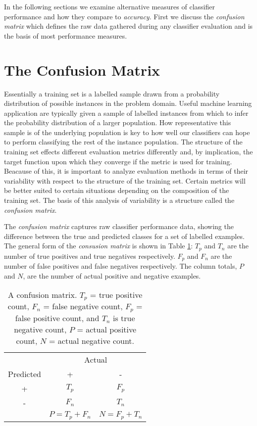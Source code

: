 \documentclass[10pt]{unbthesis}
\begin{document}
In the following sections we examine alternative measures of
classifier performance and how they compare to
\textit{accuracy}. First we discuss the \textit{confusion matrix} 
which defines the raw data gathered during any classifier evaluation
and is the basis of most performance measures.


\section{The Confusion Matrix}
\label{sec:confusionmatrix}
Essentially a training set is a labelled sample drawn from a
probability distribution of possible instances in the problem
domain. Useful machine learning application are typically given a
sample of labelled instances from which to infer the probability
distribution of a larger population. How representative this sample is
of the underlying population is key to how well our classifiers can
hope to perform classifying the rest of the instance population. The
structure of the training set effects different evaluation metrics
differently and, by implication, the target function upon which they
converge if the metric is used for training. Beacause of this, it is
important to analyze evaluation methods in terms of their variability
with respect to the structure of the training set. Certain metrics
will be better suited to certain situations depending on the
composition of the training set. The basis of this analysis of
variability is a structure called the \textit{confusion matrix}.

The \textit{confusion matrix} captures raw classifier performance
data, showing the difference between the true and predicted 
classes for a set of labelled examples. The general form of the
\textit{consusion matrix} is shown in Table \ref{tab:confusionmatrix}: \(T_p\)
and \(T_n\) are the number of true positives and true negatives
respectively. \(F_p\) and \(F_n\) are the number of false positives
and false negatives respectively. The column totals, \(P\) and \(N\),
are the number of actual positive and negative examples. 

\begin{table}
\centering
  \begin{tabular}{c|c|c|}
    & \multicolumn{2}{|c|}{Actual} \\ \cline{1-3}
 Predicted & +                   & -                  \\ \hline
    +      & \(T_p\)             & \(F_p\)             \\ \hline
    -      & \(F_n\)             & \(T_n\)             \\ \hline
           & \(P = T_p + F_n\)   & \(N = F_p + T_n\)    \\ \cline{2-3}
  \end{tabular}
  \caption{A confusion matrix. \(T_p\) = true positive count, \(F_n\)
  = false negative count, \(F_p\) = false positive count, and \(T_n\)
  is true negative count, \(P\) = actual positive count, \(N\) = actual
  negative count.}
  \label{tab:confusionmatrix}
\end{table}
\end{document}
